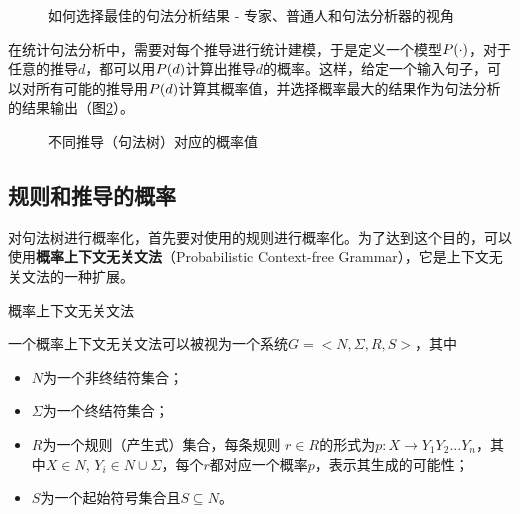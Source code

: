 \begin{figure}[htp]
    \centering

	\caption{如何选择最佳的句法分析结果 - 专家、普通人和句法分析器的视角}
    \label{fig:3.4-5}
\end{figure}

\parinterval 在统计句法分析中，需要对每个推导进行统计建模，于是定义一个模型${P}( \cdot )$，对于任意的推导$d$，都可以用${P}(d)$计算出推导$d$的概率。这样，给定一个输入句子，可以对所有可能的推导用${P}(d)$计算其概率值，并选择概率最大的结果作为句法分析的结果输出（图\ref{fig:3.4-6}）。

\begin{figure}[htp]
    \centering

	\caption{不同推导（句法树）对应的概率值}
    \label{fig:3.4-6}
\end{figure}


\subsection{规则和推导的概率}

\parinterval 对句法树进行概率化，首先要对使用的规则进行概率化。为了达到这个目的，可以使用{\small\sffamily\bfseries{概率上下文无关文法}}（Probabilistic Context-free Grammar），它是上下文无关文法的一种扩展。

\vspace{0.5em}
\begin{definition} 概率上下文无关文法

一个概率上下文无关文法可以被视为一个系统$G=<N,\varSigma,R,S>$，其中
\begin{itemize}
\vspace{0.5em}
\item $N$为一个非终结符集合；
\vspace{0.5em}
\item $\varSigma$为一个终结符集合；
\vspace{0.5em}
\item $R$为一个规则（产生式）集合，每条规则 $r \in R$的形式为$p:X \to Y_1Y_2...Y_n$，其中$X \in N$, $Y_i \in N \cup \varSigma$，每个$r$都对应一个概率$p$，表示其生成的可能性；
\vspace{0.5em}
\item $S$为一个起始符号集合且$S \subseteq N$。
\vspace{0.5em}
\end{itemize}
\end{definition}

